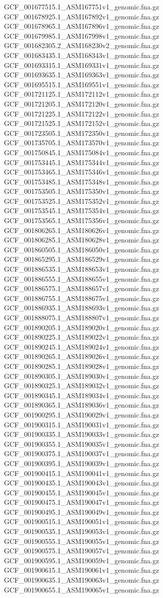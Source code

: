 \documentclass[12pt, letterpaper]{article}
\begin{document}
\begin{verbatim*}
GCF_001677515.1_ASM167751v1_genomic.fna.gz
GCF_001678925.1_ASM167892v1_genomic.fna.gz
GCF_001678965.1_ASM167896v1_genomic.fna.gz
GCF_001679985.1_ASM167998v1_genomic.fna.gz
GCF_001682305.2_ASM168230v2_genomic.fna.gz
GCF_001683435.1_ASM168343v1_genomic.fna.gz
GCF_001693315.1_ASM169331v1_genomic.fna.gz
GCF_001693635.1_ASM169363v1_genomic.fna.gz
GCF_001695515.1_ASM169551v1_genomic.fna.gz
GCF_001721125.1_ASM172112v1_genomic.fna.gz
GCF_001721205.1_ASM172120v1_genomic.fna.gz
GCF_001721225.1_ASM172122v1_genomic.fna.gz
GCF_001721525.1_ASM172152v1_genomic.fna.gz
GCF_001723505.1_ASM172350v1_genomic.fna.gz
GCF_001735705.1_ASM173570v1_genomic.fna.gz
GCF_001750845.1_ASM175084v1_genomic.fna.gz
GCF_001753445.1_ASM175344v1_genomic.fna.gz
GCF_001753465.1_ASM175346v1_genomic.fna.gz
GCF_001753485.1_ASM175348v1_genomic.fna.gz
GCF_001753505.1_ASM175350v1_genomic.fna.gz
GCF_001753525.1_ASM175352v1_genomic.fna.gz
GCF_001753545.1_ASM175354v1_genomic.fna.gz
GCF_001753565.1_ASM175356v1_genomic.fna.gz
GCF_001806265.1_ASM180626v1_genomic.fna.gz
GCF_001806285.1_ASM180628v1_genomic.fna.gz
GCF_001860505.1_ASM186050v1_genomic.fna.gz
GCF_001865295.1_ASM186529v1_genomic.fna.gz
GCF_001886535.1_ASM188653v1_genomic.fna.gz
GCF_001886555.1_ASM188655v1_genomic.fna.gz
GCF_001886575.1_ASM188657v1_genomic.fna.gz
GCF_001886755.1_ASM188675v1_genomic.fna.gz
GCF_001886935.1_ASM188693v1_genomic.fna.gz
GCF_001888075.1_ASM188807v1_genomic.fna.gz
GCF_001890205.1_ASM189020v1_genomic.fna.gz
GCF_001890225.1_ASM189022v1_genomic.fna.gz
GCF_001890245.1_ASM189024v1_genomic.fna.gz
GCF_001890265.1_ASM189026v1_genomic.fna.gz
GCF_001890285.1_ASM189028v1_genomic.fna.gz
GCF_001890305.1_ASM189030v1_genomic.fna.gz
GCF_001890325.1_ASM189032v1_genomic.fna.gz
GCF_001890345.1_ASM189034v1_genomic.fna.gz
GCF_001890365.1_ASM189036v1_genomic.fna.gz
GCF_001900295.1_ASM190029v1_genomic.fna.gz
GCF_001900315.1_ASM190031v1_genomic.fna.gz
GCF_001900335.1_ASM190033v1_genomic.fna.gz
GCF_001900355.1_ASM190035v1_genomic.fna.gz
GCF_001900375.1_ASM190037v1_genomic.fna.gz
GCF_001900395.1_ASM190039v1_genomic.fna.gz
GCF_001900415.1_ASM190041v1_genomic.fna.gz
GCF_001900435.1_ASM190043v1_genomic.fna.gz
GCF_001900455.1_ASM190045v1_genomic.fna.gz
GCF_001900475.1_ASM190047v1_genomic.fna.gz
GCF_001900495.1_ASM190049v1_genomic.fna.gz
GCF_001900515.1_ASM190051v1_genomic.fna.gz
GCF_001900535.1_ASM190053v1_genomic.fna.gz
GCF_001900555.1_ASM190055v1_genomic.fna.gz
GCF_001900575.1_ASM190057v1_genomic.fna.gz
GCF_001900595.1_ASM190059v1_genomic.fna.gz
GCF_001900615.1_ASM190061v1_genomic.fna.gz
GCF_001900635.1_ASM190063v1_genomic.fna.gz
GCF_001900655.1_ASM190065v1_genomic.fna.gz

\end{verbatim*}
\end{document}
